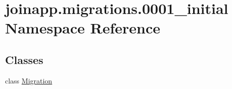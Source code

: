 \hypertarget{namespacejoinapp_1_1migrations_1_10001__initial}{}\section{joinapp.\+migrations.0001\+\_\+initial Namespace Reference}
\label{namespacejoinapp_1_1migrations_1_10001__initial}
\subsection*{Classes}
\begin{DoxyCompactItemize}
\item 
class \mbox{\hyperlink{classjoinapp_1_1migrations_1_10001__initial_1_1_migration}{Migration}}
\end{DoxyCompactItemize}
